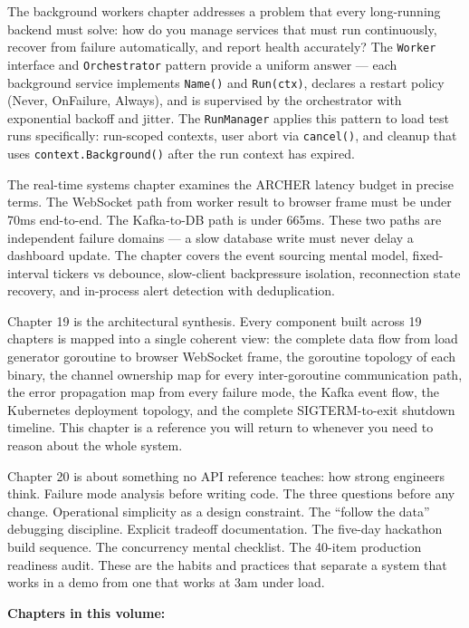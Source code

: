 \documentclass[
]{article}
\begin{document}
The background workers chapter addresses a problem that every
long-running backend must solve: how do you manage services that must
run continuously, recover from failure automatically, and report health
accurately? The \texttt{Worker} interface and \texttt{Orchestrator}
pattern provide a uniform answer --- each background service implements
\texttt{Name()} and \texttt{Run(ctx)}, declares a restart policy (Never,
OnFailure, Always), and is supervised by the orchestrator with
exponential backoff and jitter. The \texttt{RunManager} applies this
pattern to load test runs specifically: run-scoped contexts, user abort
via \texttt{cancel()}, and cleanup that uses
\texttt{context.Background()} after the run context has expired.

The real-time systems chapter examines the ARCHER latency budget in
precise terms. The WebSocket path from worker result to browser frame
must be under 70ms end-to-end. The Kafka-to-DB path is under 665ms.
These two paths are independent failure domains --- a slow database
write must never delay a dashboard update. The chapter covers the event
sourcing mental model, fixed-interval tickers vs debounce, slow-client
backpressure isolation, reconnection state recovery, and in-process
alert detection with deduplication.

Chapter 19 is the architectural synthesis. Every component built across
19 chapters is mapped into a single coherent view: the complete data
flow from load generator goroutine to browser WebSocket frame, the
goroutine topology of each binary, the channel ownership map for every
inter-goroutine communication path, the error propagation map from every
failure mode, the Kafka event flow, the Kubernetes deployment topology,
and the complete SIGTERM-to-exit shutdown timeline. This chapter is a
reference you will return to whenever you need to reason about the whole
system.

Chapter 20 is about something no API reference teaches: how strong
engineers think. Failure mode analysis before writing code. The three
questions before any change. Operational simplicity as a design
constraint. The ``follow the data'' debugging discipline. Explicit
tradeoff documentation. The five-day hackathon build sequence. The
concurrency mental checklist. The 40-item production readiness audit.
These are the habits and practices that separate a system that works in
a demo from one that works at 3am under load.

\textbf{Chapters in this volume:}
\end{document}
